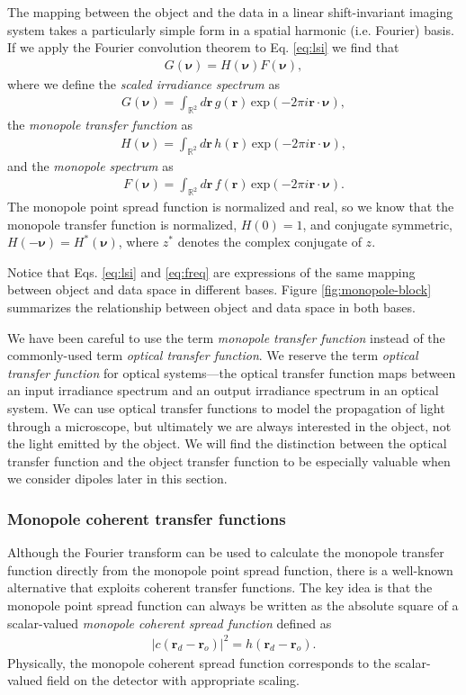 \documentclass[]{osa-article}
\providecommand{\mb}[1]{\mathbf{#1}}
\providecommand{\ro}{\mathbf{\mathbf{r}}_o}
\providecommand{\rd}{\mathbf{r}_d}
\providecommand{\mbb}[1]{\mathbb{#1}}
\providecommand{\bs}[1]{\boldsymbol{#1}}
\providecommand{\bv}{\bs{\nu}}
\begin{document}
The mapping between the object and the data in a linear shift-invariant imaging
system takes a particularly simple form in a spatial harmonic (i.e. Fourier) basis. If we apply
the Fourier convolution theorem to Eq. \eqref{eq:lsi} we find that
\begin{align}
  G(\bv) = H(\bv)F(\bv),\label{eq:freq}
\end{align}
where we define the \textit{scaled irradiance spectrum} as
\begin{align}
  G(\bv) = \int_{\mbb{R}^2}d\mb{r}\, g(\mb{r})\, \text{exp}(-2\pi i\mb{r}\cdot\bv),
\end{align}
the \textit{monopole transfer function} as
\begin{align}
  H(\bv) = \int_{\mbb{R}^2}d\mb{r}\, h(\mb{r})\, \text{exp}(-2\pi i\mb{r}\cdot\bv),\label{eq:otf}
\end{align}
and the \textit{monopole spectrum} as
\begin{align}
    F(\bv) = \int_{\mbb{R}^2}d\mb{r}\, f(\mb{r})\, \text{exp}(-2\pi i\mb{r}\cdot\bv).
\end{align}
The monopole point spread function is normalized and real, so we know that the
monopole transfer function is normalized, $H(0) = 1$, and conjugate symmetric,
$H(-\bv) = H^*(\bv)$, where $z^*$ denotes the complex conjugate of $z$.

Notice that Eqs. \eqref{eq:lsi} and \eqref{eq:freq} are expressions of the same
mapping between object and data space in different bases. Figure
\ref{fig:monopole-block} summarizes the relationship between object and data
space in both bases.

We have been careful to use the term \textit{monopole transfer function} instead
of the commonly-used term \textit{optical transfer function}. We reserve the
term \textit{optical transfer function} for optical systems---the optical
transfer function maps between an input irradiance spectrum and an output
irradiance spectrum in an optical system. We can use optical transfer functions
to model the propagation of light through a microscope, but ultimately we are
always interested in the object, not the light emitted by the object. We will
find the distinction between the optical transfer function and the object
transfer function to be especially valuable when we consider dipoles later in
this section.

\subsubsection{Monopole coherent transfer functions}
Although the Fourier transform can be used to calculate the monopole transfer
function directly from the monopole point spread function, there is a well-known
alternative that exploits coherent transfer functions. The key idea is that the
monopole point spread function can always be written as the absolute square of a
scalar-valued \textit{monopole coherent spread function} defined as
\begin{align}
  |c(\rd - \ro)|^2 = h(\rd - \ro). \label{eq:absquarescalar}
\end{align}
Physically, the monopole coherent spread function corresponds to the
scalar-valued field on the detector with appropriate scaling.
\end{document}
